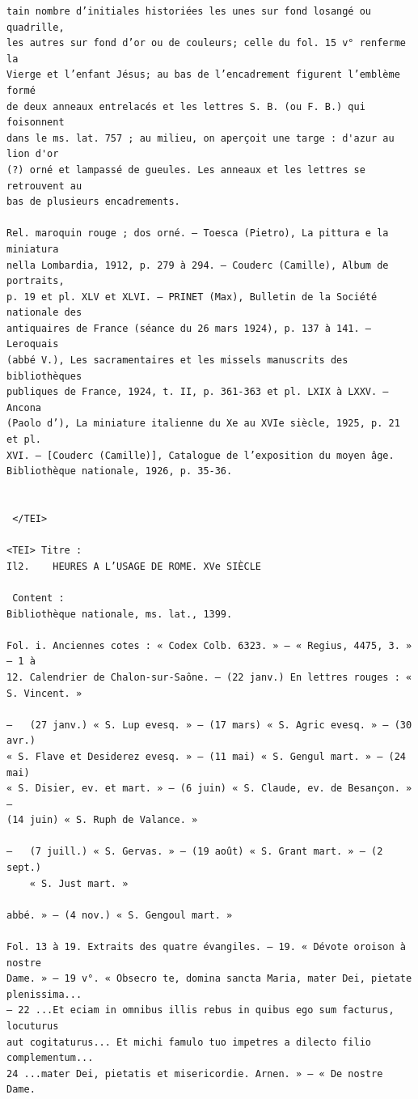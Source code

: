 \documentclass[a4paper,12pt,twoside]{book}
\begin{document}
\begin{verbatim}
tain nombre d’initiales historiées les unes sur fond losangé ou quadrille, 
les autres sur fond d’or ou de couleurs; celle du fol. 15 v° renferme la 
Vierge et l’enfant Jésus; au bas de l’encadrement figurent l’emblème formé
de deux anneaux entrelacés et les lettres S. B. (ou F. B.) qui foisonnent 
dans le ms. lat. 757 ; au milieu, on aperçoit une targe : d'azur au lion d'or 
(?) orné et lampassé de gueules. Les anneaux et les lettres se retrouvent au 
bas de plusieurs encadrements.

Rel. maroquin rouge ; dos orné. — Toesca (Pietro), La pittura e la miniatura 
nella Lombardia, 1912, p. 279 à 294. — Couderc (Camille), Album de portraits, 
p. 19 et pl. XLV et XLVI. — PRINET (Max), Bulletin de la Société nationale des
antiquaires de France (séance du 26 mars 1924), p. 137 à 141. — Leroquais 
(abbé V.), Les sacramentaires et les missels manuscrits des bibliothèques 
publiques de France, 1924, t. II, p. 361-363 et pl. LXIX à LXXV. — Ancona 
(Paolo d’), La miniature italienne du Xe au XVIe siècle, 1925, p. 21 et pl.
XVI. — [Couderc (Camille)], Catalogue de l’exposition du moyen âge.
Bibliothèque nationale, 1926, p. 35-36.


 </TEI> 

<TEI> Titre : 
Il2.	HEURES A L’USAGE DE ROME. XVe SIÈCLE
 
 Content : 
Bibliothèque nationale, ms. lat., 1399.

Fol. i. Anciennes cotes : « Codex Colb. 6323. » — « Regius, 4475, 3. » — 1 à 
12. Calendrier de Chalon-sur-Saône. — (22 janv.) En lettres rouges : « S. Vincent. »

—	(27 janv.) « S. Lup evesq. » — (17 mars) « S. Agric evesq. » — (30 avr.)
« S. Flave et Desiderez evesq. » — (11 mai) « S. Gengul mart. » — (24 mai) 
« S. Disier, ev. et mart. » — (6 juin) « S. Claude, ev. de Besançon. » — 
(14 juin) « S. Ruph de Valance. »

—	(7 juill.) « S. Gervas. » — (19 août) « S. Grant mart. » — (2 sept.) 
	« S. Just mart. »

abbé. » — (4 nov.) « S. Gengoul mart. »

Fol. 13 à 19. Extraits des quatre évangiles. — 19. « Dévote oroison à nostre 
Dame. » — 19 v°. « Obsecro te, domina sancta Maria, mater Dei, pietate plenissima...
— 22 ...Et eciam in omnibus illis rebus in quibus ego sum facturus, locuturus 
aut cogitaturus... Et michi famulo tuo impetres a dilecto filio complementum... 
24 ...mater Dei, pietatis et misericordie. Arnen. » — « De nostre Dame.


\end{verbatim}
\end{document}
